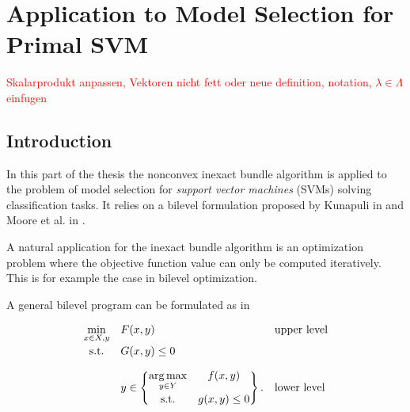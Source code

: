 \section{Application to Model Selection for Primal SVM}

\textcolor{red}{Skalarprodukt anpassen, Vektoren nicht fett oder neue definition, notation, \(\lambda \in \Lambda\) einfugen}

\subsection{Introduction}

In this part of the thesis the nonconvex inexact bundle algorithm is applied to the problem of model selection for \emph{support vector machines} (SVMs) solving classification tasks.
It relies on a bilevel formulation proposed by Kunapuli in \cite{Kunapuli2008} and Moore et al. in \cite{Moore2011}.

A natural application for the inexact bundle algorithm is an optimization problem where the objective function value can only be computed iteratively. This is for example the case in bilevel optimization.

A general bilevel program can be formulated as in \cite[p. 20]{Kunapuli2008}

\begin{equation}
	\begin{array}{cll}
	\displaystyle\min_{x \in X, y} & F(x,y) & \text{upper level} \vspace{0.5ex}\\
	\text{s.t.} & G(x,y) \leq 0 & \vspace{1em}\\
	& y \in \begin{Bmatrix} \displaystyle\argmax_{y\in Y} & f(x,y) \vspace{0.5ex}\\
	                        \text{s.t.} & g(x,y) \leq 0 
													\end{Bmatrix}. & \text{lower level}
	\end{array}
\end{equation}

